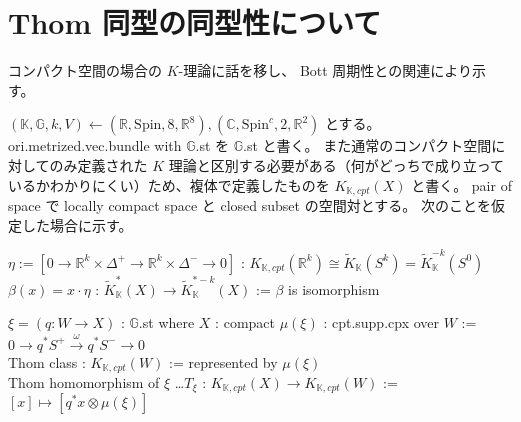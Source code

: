 \documentclass[dvipdfmx]{jsarticle}
\newcommand{\KtheoryReduced}[1]{\tilde{K}_{\mathbb{K}}(#1)}
\newcommand{\KcohomologyReduced}[2]{\tilde{K}_{\mathbb{K}}^{#1}(#2)}
\newcommand{\KtheoryCpx}[1]{K_{\mathbb{K},cpt}(#1)}
\begin{document}
\section{Thom 同型の同型性について}
コンパクト空間の場合の \(K\)-理論に話を移し、 Bott 周期性との関連により示す。

\((\mathbb{K} , \mathbb{G} , k , V) \leftarrow (\mathbb{R}, \text{Spin} , 8 , \mathbb{R}^8), (\mathbb{C}, \text{Spin}^c , 2 , \mathbb{R}^2)\) とする。
ori.metrized.vec.bundle with \(\mathbb{G}\).st を \(\mathbb{G}\).st と書く。
また通常のコンパクト空間に対してのみ定義された \(K\) 理論と区別する必要がある（何がどっちで成り立っているかわかりにくい）ため、複体で定義したものを \(\KtheoryCpx{X}\) と書く。
pair of space で locally compact space と closed subset の空間対とする。
次のことを仮定した場合に示す。
\begin{itemize}
  \itemwith \(\eta := [0 \to \mathbb{R}^{k} \times \Delta^+ \to \mathbb{R}^{k} \times \Delta^- \to 0]\) : \(\KtheoryCpx{\mathbb{R}^k} \cong \KtheoryReduced{S^k} = \KcohomologyReduced{-k}{S^0}\)
  \itemwith \(\beta(x) = x \cdot \eta\) : \(\KcohomologyReduced{*}{X} \to \KcohomologyReduced{*-k}{X}\) := \(\beta\) is isomorphism
\end{itemize}

\begin{Definition}
\itemwhen
  \Fix \(\xi = (q : W \to X)\) : \(\mathbb{G}\).st where \(X\) : compact
\itemdefi
  \Define \(\mu(\xi)\) : cpt.supp.cpx over \(W\) := \\
  \(0 \to q^*S^+ \overset{\omega}{\to}q^*S^- \to 0\) \\
  \Define Thom class : \(\KtheoryCpx{W}\) := represented by \(\mu(\xi)\) \\
  \Define Thom homomorphism of \(\xi\) \ldots \(T_{\xi}\) : \(\KtheoryCpx{X} \to \KtheoryCpx{W}\) := \([x] \mapsto [q^*x \otimes \mu(\xi)]\)
\end{Definition}

\end{document}
